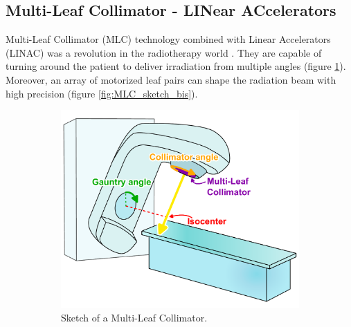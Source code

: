 \subsection[MLC-LINAC]{Multi-Leaf Collimator - LINear ACcelerators}
Multi-Leaf Collimator (MLC) technology combined with Linear Accelerators (LINAC) was a revolution in the radiotherapy world \cite{Bakiu2013} \cite{Xu2017}.
They are capable of turning around the patient to deliver irradiation from multiple angles (figure \ref{fig:MLC_sketch}).
Moreover, an array of motorized leaf pairs can shape the radiation beam with high precision (figure \ref{fig:MLC_sketch_bis}).
\begin{figure}
	\centering
	\begin{subfigure}[b]{0.55\textwidth}
		\centering
		\includegraphics[width=\textwidth]{MLC_sketch.pdf}
		\caption{Sketch of a Multi-Leaf Collimator.}
		\label{fig:MLC_sketch}
	\end{subfigure}
	\hfill
	\begin{subfigure}[b]{0.35\textwidth}
		\centering

\end{subfigure}
\end{figure}
